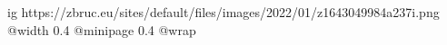  
 
 
 
 

\ifcmt
  ig https://zbruc.eu/sites/default/files/images/2022/01/z1643049984a237i.png
  @width 0.4
  @minipage 0.4
  @wrap \parpic[r]
\fi
